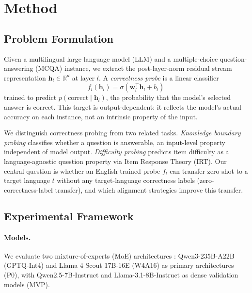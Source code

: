 \section{Method}
\label{sec:method}

\subsection{Problem Formulation}
\label{sec:problem}

Given a multilingual large language model (LLM) and a multiple-choice question-answering (MCQA) instance, we extract the post-layer-norm residual stream representation $\mathbf{h}_l \in \mathbb{R}^d$ at layer $l$. A \emph{correctness probe} is a linear classifier
\begin{equation}
  f_l(\mathbf{h}_l) = \sigma(\mathbf{w}_l^\top \mathbf{h}_l + b_l)
  \label{eq:probe}
\end{equation}
trained to predict $p(\text{correct} \mid \mathbf{h}_l)$, the probability that the model's selected answer is correct. This target is output-dependent: it reflects the model's actual accuracy on each instance, not an intrinsic property of the input.

We distinguish correctness probing from two related tasks. \emph{Knowledge boundary probing} \citep{xiao2025knowledge} classifies whether a question is answerable, an input-level property independent of model output. \emph{Difficulty probing} \citep{civelli2026shared} predicts item difficulty as a language-agnostic question property via Item Response Theory (IRT). Our central question is whether an English-trained probe $f_l$ can transfer zero-shot to a target language $t$ without any target-language correctness labels (zero-correctness-label transfer), and which alignment strategies improve this transfer.

\subsection{Experimental Framework}
\label{sec:framework}

\paragraph{Models.} We evaluate two mixture-of-experts (MoE) architectures \cite{fedus2022switch}: Qwen3-235B-A22B (GPTQ-Int4) and Llama 4 Scout 17B-16E (W4A16) as primary architectures (P0), with Qwen2.5-7B-Instruct and Llama-3.1-8B-Instruct as dense validation models (MVP).

